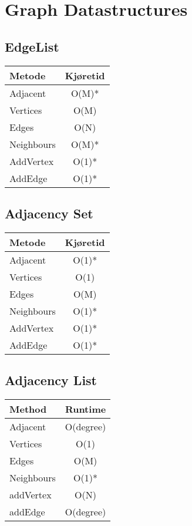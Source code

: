 \documentclass{article}
\begin{document}
\section{Graph Datastructures}
\subsection{EdgeList}
\begin{table}[h!]
\centering
\begin{tabular}{|l|c|}
\hline
\textbf{Metode} & \textbf{Kjøretid} \\
\hline
Adjacent & O(M)* \\
\hline
Vertices & O(M) \\
\hline
Edges & O(N) \\
\hline
Neighbours & O(M)* \\
\hline
AddVertex & O(1)* \\
\hline
AddEdge & O(1)* \\
\hline
\end{tabular}
\end{table}



\subsection{Adjacency Set}
\begin{table}[h!]
\centering
\begin{tabular}{|l|c|}
\hline
\textbf{Metode} & \textbf{Kjøretid} \\
\hline
Adjacent & O(1)* \\
\hline
Vertices & O(1) \\
\hline
Edges & O(M) \\
\hline
Neighbours & O(1)* \\
\hline
AddVertex & O(1)* \\
\hline
AddEdge & O(1)* \\
\hline
\end{tabular}
\end{table}


\subsection{Adjacency List}
\begin{table}[h!]
\centering
\begin{tabular}{|l|c|}
\hline
\textbf{Method} & \textbf{Runtime} \\
\hline
Adjacent & O(degree) \\
\hline
Vertices & O(1) \\
\hline
Edges & O(M) \\
\hline
Neighbours & O(1)* \\
\hline
addVertex & O(N) \\
\hline
addEdge & O(degree) \\
\hline
\end{tabular}
\end{table}
\end{document}
